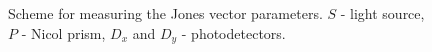 \begin{figure}
\centering



\caption{Scheme for measuring the Jones vector parameters. $S$ - light source, $P$
  - Nicol prism, $D_x$ and $D_y$ -
photodetectors.}
\label{figPart3EntangJones}
\end{figure}